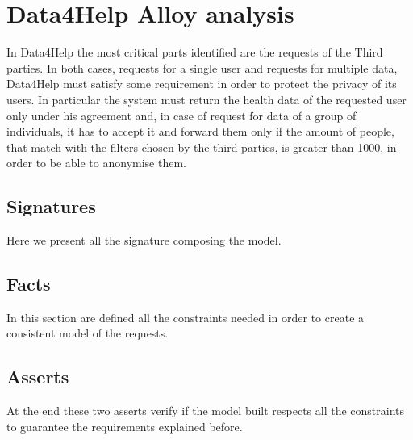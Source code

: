 \section{Data4Help Alloy analysis}

    In Data4Help the most critical parts identified are the requests of the Third parties. In both cases, requests for a single user and requests for multiple data, Data4Help must satisfy some requirement in order to protect the privacy of its users.
    In particular the system must return the health data of the requested user only under his agreement and, in case of request for data of a group of individuals, it has to accept it and forward them only if the amount of people, that match with the filters chosen by the third parties, is greater than 1000, in order to be able to anonymise them.
    
    \subsection{Signatures}
    
    Here we present all the signature composing the model.
    
    

    \subsection{Facts}
 
        In this section are defined all the constraints needed in order to create a consistent model of the requests.
    
        

    \subsection{Asserts}
    
        At the end these two asserts verify if the model built respects all the constraints to guarantee the requirements explained before.
    
        






    
